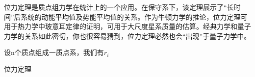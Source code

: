 位力定理是质点组力学在统计上的一个应用。在保守系下，该定理展示了“长时间”后系统的动能平均值及势能平均值的关系。作为牛顿力学的推论，位力定理可用于热力学中玻意耳定律的证明，可用于大尺度星系质量的估算。经典力学和量子力学的关系如此密切，你也很容易猜到，位力定理必然也会“出现”于量子力学中。

设n个质点组成一质点系，我们有$r_i$
\begin{theorem}{位力定理}

\end{theorem}
